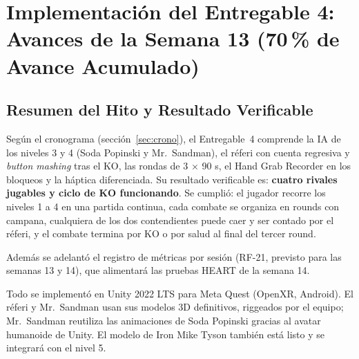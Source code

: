 \section{Implementación del Entregable 4: Avances de la Semana 13 (70\,\% de Avance Acumulado)}
\label{sec:e4}
\subsection{Resumen del Hito y Resultado Verificable}
Según el cronograma (sección~\ref{sec:crono}), el Entregable~4 comprende la IA de los niveles 3 y 4 (Soda Popinski y Mr.\ Sandman), el réferi con cuenta regresiva y \emph{button mashing} tras el KO, las rondas de 3 $\times$ 90 s, el Hand Grab Recorder en los bloqueos y la háptica diferenciada. Su resultado verificable es: \textbf{cuatro rivales jugables y ciclo de KO funcionando}. Se cumplió: el jugador recorre los niveles 1 a 4 en una partida continua, cada combate se organiza en rounds con campana, cualquiera de los dos contendientes puede caer y ser contado por el réferi, y el combate termina por KO o por salud al final del tercer round.

Además se adelantó el registro de métricas por sesión (RF-21, previsto para las semanas 13 y 14), que alimentará las pruebas HEART de la semana 14.

Todo se implementó en Unity 2022 LTS para Meta Quest (OpenXR, Android). El réferi y Mr.\ Sandman usan sus modelos 3D definitivos, riggeados por el equipo; Mr.\ Sandman reutiliza las animaciones de Soda Popinski gracias al avatar humanoide de Unity. El modelo de Iron Mike Tyson también está listo y se integrará con el nivel 5.

\begin{table}[H]
\centering
\caption{Bloques de trabajo del Entregable 4.}
\end{table}

